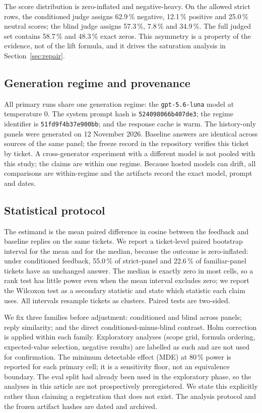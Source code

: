 The score distribution is zero-inflated and negative-heavy. On the allowed strict
rows, the conditioned judge assigns 62.9\,\% negative, 12.1\,\% positive and
25.0\,\% neutral scores; the blind judge assigns 57.3\,\%, 7.8\,\% and 34.9\,\%.
The full judged set contains 58.7\,\% and 48.3\,\% exact zeros. This asymmetry is a
property of the evidence, not of the lift formula, and it drives the saturation
analysis in Section~\ref{sec:repair}.

\subsection{Generation regime and provenance}
All primary runs share one generation regime: the \texttt{gpt-5.6-luna} model at
temperature 0. The system prompt hash is \texttt{524098066b407de3}; the regime
identifier is \texttt{51fd9f4b37e900bb}; and the response cache is warm. The
history-only panels were generated on 12 November 2026. Baseline answers are identical across sources of the
same panel; the freeze record in the repository verifies this ticket by ticket. A
cross-generator experiment with a different model is not pooled with this study;
the claims are within one regime. Because
hosted models can drift, all comparisons are within-regime and the artifacts record
the exact model, prompt and dates.

\subsection{Statistical protocol}
The estimand is the mean paired difference in cosine between the feedback and
baseline replies on the same tickets. We report a ticket-level paired bootstrap
interval for the mean and for the median, because the outcome is zero-inflated:
under conditioned feedback, 55.0\,\% of strict-panel and 22.6\,\% of familiar-panel
tickets have an unchanged answer. The median is exactly zero in most cells, so a
rank test has little power even when the mean interval excludes zero; we report the
Wilcoxon test as a secondary statistic and state which statistic each claim uses.
All intervals resample tickets as clusters. Paired tests are two-sided.

We fix three families before adjustment: conditioned and blind across
panels; reply similarity; and the direct conditioned-minus-blind contrast. Holm
correction is applied within each family. Exploratory analyses (scope grid, formula
ordering, expected-value selection, negative results) are labelled as such and are
not used for confirmation. The minimum detectable effect (MDE) at 80\,\% power is
reported for each primary cell; it is a sensitivity floor, not an equivalence
boundary. The eval split had already been used in the exploratory phase, so the
analyses in this article are not prospectively preregistered. We state this explicitly
rather than claiming a registration that does not exist. The analysis protocol and
the frozen artifact hashes are dated and archived.

